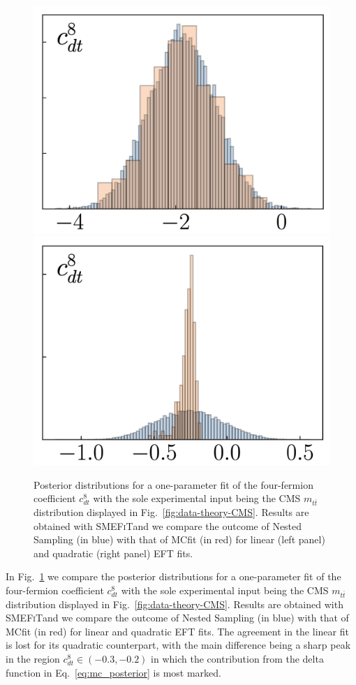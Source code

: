 \documentclass[withindex,glossary]{cam-thesis}
\newcommand{\smefit}{\textsc{SMEFiT}}
\begin{document}
\begin{figure}[htb]
        \centering
        \includegraphics[width=0.49\linewidth]{smeft_plots/linear_O8dt.png}
        \includegraphics[width=0.49\linewidth]{smeft_plots/quadratic_O8dt.png}
        \caption{Posterior distributions for a one-parameter fit
          of the four-fermion coefficient $c_{dt}^8$ with the sole experimental
          input being the CMS $m_{t\bar{t}}$ distribution
          displayed in Fig.~\ref{fig:data-theory-CMS}.
          Results are obtained with \smefit and we compare the outcome of Nested Sampling (in blue) with
          that of MCfit (in red)
          for linear (left panel) and quadratic (right panel) EFT fits.
        }
    \label{fig:O8dt-fit}
\end{figure}

In Fig.~\ref{fig:O8dt-fit} we
compare the posterior distributions for a one-parameter fit
of the four-fermion coefficient $c_{dt}^8$ with the sole experimental
input being the CMS $m_{t\bar{t}}$ distribution
displayed in Fig.~\ref{fig:data-theory-CMS}.
%
Results are obtained with \smefit and we compare the outcome of Nested Sampling (in blue) with
that of MCfit (in red)
for linear and quadratic  EFT fits.
%
The agreement in the linear fit is lost for its quadratic counterpart,
with the main difference being a sharp peak in the region
$c_{dt}^8 \in (-0.3,-0.2)$ in which the contribution
from the delta function in Eq.~\ref{eq:mc_posterior} is most
marked.
\end{document}
